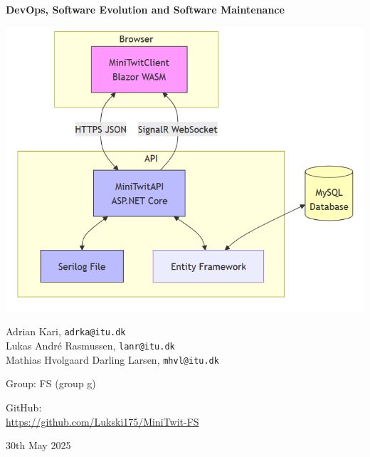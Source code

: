 \documentclass{article}
\begin{document}
\begin{titlepage}
  \centering
  {\LARGE\bfseries DevOps, Software Evolution and Software Maintenance\par}
  \vspace{1.5cm}
  \includegraphics[width=1\textwidth]{images/Architecture.png}\par
  \vspace{1cm}
  {\large
    Adrian Kari, \texttt{adrka@itu.dk}\\[0.5ex]
    Lukas André Rasmussen, \texttt{lanr@itu.dk}\\[0.5ex]
    Mathias Hvolgaard Darling Larsen, \texttt{mhvl@itu.dk}
  \par}
  \vfill

  Group: FS (group g)

  \vfill

  GitHub:\\
  \url{https://github.com/Lukski175/MiniTwit-FS}

  \vspace{1cm}
  {\large 30th May 2025\par}
\end{titlepage}


\tableofcontents





\printbibliography
\end{document}
